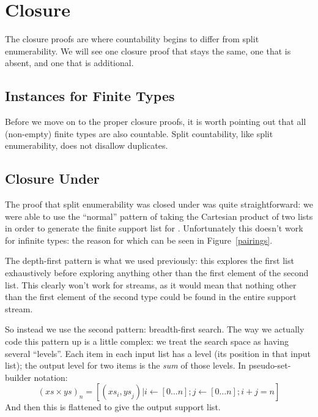 \section{Closure}
The closure proofs are where countability begins to differ from split
enumerability.
We will see one closure proof that stays the same, one that is absent, and one
that is additional.
\subsection{Instances for Finite Types}
Before we move on to the proper closure proofs, it is worth pointing out that
all (non-empty) finite types are also countable.
Split countability, like split enumerability, does not disallow duplicates.
\subsection{Closure Under \AgdaDatatype{\(\Sigma\)}}
The proof that split enumerability was closed under \AgdaDatatype{\(\Sigma\)}
was quite straightforward:
we were able to use the ``normal'' pattern of taking the Cartesian product of
two lists in order to generate the finite support list for
\AgdaDatatype{\(\Sigma\)}.
Unfortunately this doesn't work for infinite types: the reason for which can be
seen in Figure~\ref{pairings}.



The depth-first pattern is what we used previously: this explores the first list
exhaustively before exploring anything other than the first element of the
second list.
This clearly won't work for streams, as it would mean that nothing other than
the first element of the second type could be found in the entire support
stream.

So instead we use the second pattern: breadth-first search.
The way we actually code this pattern up is a little complex: we treat the
search space as having several ``levels''.
Each item in each input list has a level (its position in that input list); the
output level for two items is the \emph{sum} of those levels.
In pseudo-set-builder notation: 
\begin{equation*}
  (\mathit{xs}\times\mathit{ys})_n =
    \left[ (\mathit{xs}_i , \mathit{ys}_j) \vert i \leftarrow \left[ 0 \ldots n \right] ; j \leftarrow \left[ 0 \ldots n \right] ; i + j = n  \right]
\end{equation*}
And then this is flattened to give the output support list.

